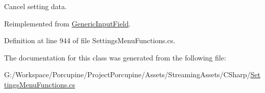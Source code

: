 Cancel setting data. 



Reimplemented from \hyperlink{class_generic_input_field_ae3195906f6ed8b00182ba832e43981f6}{Generic\+Input\+Field}.



Definition at line 944 of file Settings\+Menu\+Functions.\+cs.



The documentation for this class was generated from the following file\+:\begin{DoxyCompactItemize}
\item 
G\+:/\+Workspace/\+Porcupine/\+Project\+Porcupine/\+Assets/\+Streaming\+Assets/\+C\+Sharp/\hyperlink{_settings_menu_functions_8cs}{Settings\+Menu\+Functions.\+cs}\end{DoxyCompactItemize}
